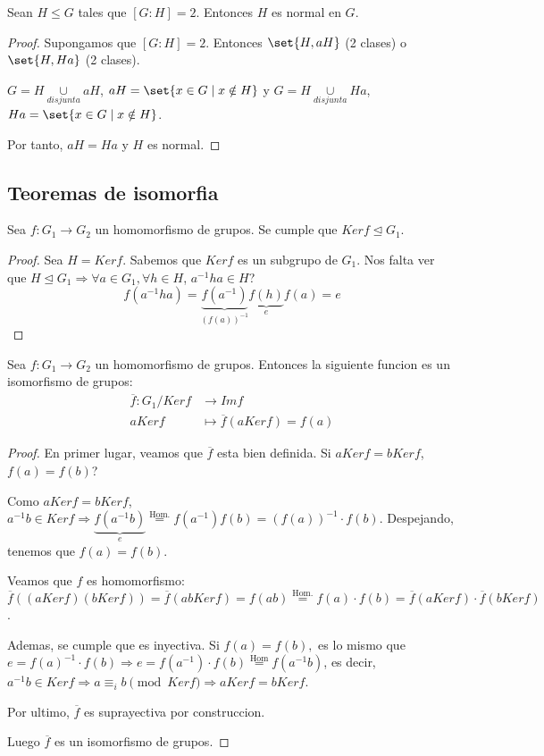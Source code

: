 \begin{proposition}
	Sean \(H \leq  G \) tales que \([G \colon H ] = 2 \). Entonces \(H \) es normal en \(G \).
\end{proposition}
\begin{proof}
	Supongamos que \([G \colon H] = 2 \). Entonces \(\set{H, aH }\) (2 clases) o \(\set{H, Ha }\) (2 clases).
	
	\(G = H \underset{disjunta}{\cup } aH \), \(aH = \set{x \in G \mid x \notin H }\) y \(G = H \underset{disjunta}{\cup } Ha \), \(Ha = \set{x \in G \mid x \notin H }\).
	
	Por tanto, \(aH = Ha \) y \(H \) es normal.
\end{proof}

\subsection{Teoremas de isomorfia}
\begin{proposition}
	Sea \(f \colon G_1 \to G_2 \) un homomorfismo de grupos. Se cumple que \(Kerf \trianglelefteq G_1 \).
\end{proposition}
\begin{proof}
	Sea \(H = Kerf \). Sabemos que \(Kerf \) es un subgrupo de \(G_1 \). Nos falta ver que \(H \trianglelefteq G_1 \Rightarrow \forall a \in G_1, \forall h \in H\), \(a^{-1} h a \in H \)?
	\[
		f(a^{-1} h a ) = \underbrace{f(a^{-1} )}_{(f(a))^{-1} } \underbrace{f(h)}_{e} f(a) = e
	\]
\end{proof}
\begin{theorem}
	Sea \(f \colon G_1 \to G_2 \) un homomorfismo de grupos. Entonces la siguiente funcion es un isomorfismo de grupos:
	\[
		\begin{aligned}
			\overline{f} \colon G_1 / Kerf & \longrightarrow Imf                         \\
			a Kerf                         & \longmapsto \overline{f} (a Kerf ) = f(a )
		\end{aligned}
	\]
\end{theorem}
\begin{proof}
	En primer lugar, veamos que \(\overline{f}\) esta bien definida. Si \(a  Kerf = b Kerf \), \(f(a) = f(b )\)?
	
	Como \(a Kerf = bKerf \), \(a^{-1} b \in Kerf \Rightarrow \underbrace{f(a^{-1} b)}_e \overset{\text{Hom.} }{=} f(a^{-1} ) f(b) = (f(a))^{-1} \cdot f(b )\). Despejando, tenemos que \(f(a) = f(b )\).
	
	Veamos que \(f \) es homomorfismo: \(\overline{f}((aKerf)(bKerf)) = \overline{f}(abKerf) = f(ab) \overset{\text{Hom.} }{=} f(a) \cdot f(b) = \overline{f}(aKerf) \cdot \overline{f}(bKerf)\).
	
	Ademas, se cumple que es inyectiva. Si \(f(a) = f(b ), \) es lo mismo que \(e = f(a)^{-1} \cdot f(b) \Rightarrow e = f(a^{-1} ) \cdot f(b) \overset{\text{Hom} }{=} f(a^{-1} b )\), es decir, \(a^{-1} b \in Kerf \Rightarrow a \equiv_i b \pmod {Kerf} \Rightarrow aKerf = b Kerf\).
	
	Por ultimo, \(\overline{f }\) es suprayectiva por construccion.
	
	Luego \(\overline{f }\) es un isomorfismo de grupos.
\end{proof}
